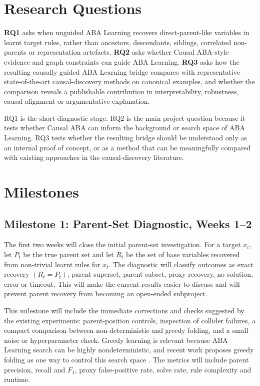 \section{Research Questions}
\label{sec:project-plan-rqs}

\textbf{RQ1} asks when unguided ABA Learning recovers direct-parent-like variables in learnt target rules, rather than ancestors, descendants, siblings, correlated non-parents or representation artefacts. \textbf{RQ2} asks whether Causal ABA-style evidence and graph constraints can guide ABA Learning. \textbf{RQ3} asks how the resulting causally guided ABA Learning bridge compares with representative state-of-the-art causal-discovery methods on canonical examples, and whether the comparison reveals a publishable contribution in interpretability, robustness, causal alignment or argumentative explanation.

RQ1 is the short diagnostic stage. RQ2 is the main project question because it tests whether Causal ABA can inform the background or search space of ABA Learning. RQ3 tests whether the resulting bridge should be understood only as an internal proof of concept, or as a method that can be meaningfully compared with existing approaches in the causal-discovery literature.

\section{Milestones}
\label{sec:project-plan-milestones}

\subsection{Milestone 1: Parent-Set Diagnostic, Weeks 1--2}
\label{subsec:milestone-parent-set}

The first two weeks will close the initial parent-set investigation. For a target \(x_t\), let \(P_t\) be the true parent set and let \(R_t\) be the set of base variables recovered from non-trivial learnt rules for \(x_t\). The diagnostic will classify outcomes as exact recovery \((R_t=P_t)\), parent superset, parent subset, proxy recovery, no-solution, error or timeout. This will make the current results easier to discuss and will prevent parent recovery from becoming an open-ended subproject.

This milestone will include the immediate corrections and checks suggested by the existing experiments: parent-position controls, inspection of collider failures, a compact comparison between non-deterministic and greedy folding, and a small noise or hyperparameter check. Greedy learning is relevant because ABA Learning search can be highly nondeterministic, and recent work proposes greedy folding as one way to control this search space \cite{de2025greedy}. The metrics will include parent precision, recall and \(F_1\), proxy false-positive rate, solve rate, rule complexity and runtime.

